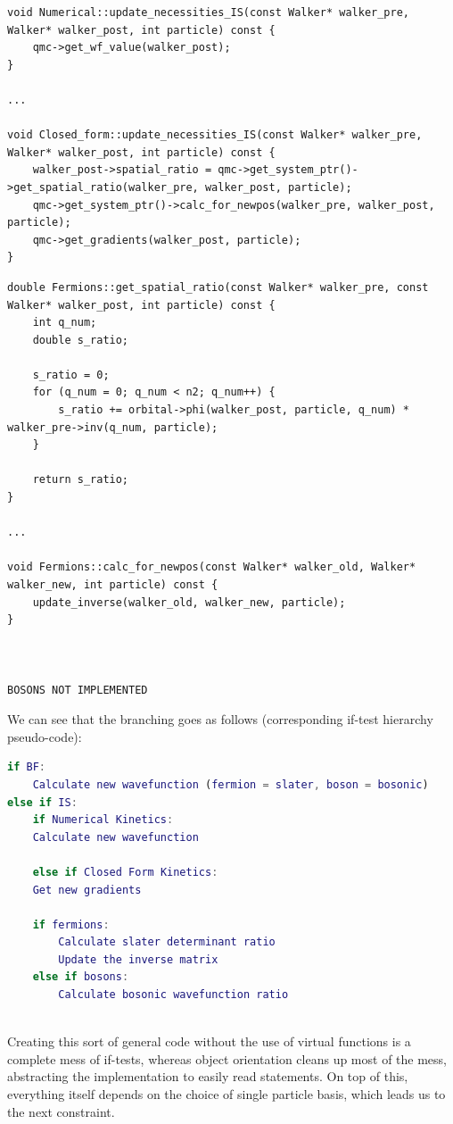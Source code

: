 \begin{lstlisting}
void Numerical::update_necessities_IS(const Walker* walker_pre, Walker* walker_post, int particle) const {
    qmc->get_wf_value(walker_post);
}

...

void Closed_form::update_necessities_IS(const Walker* walker_pre, Walker* walker_post, int particle) const {
    walker_post->spatial_ratio = qmc->get_system_ptr()->get_spatial_ratio(walker_pre, walker_post, particle);
    qmc->get_system_ptr()->calc_for_newpos(walker_pre, walker_post, particle);
    qmc->get_gradients(walker_post, particle);
}
\end{lstlisting}

\begin{lstlisting}
double Fermions::get_spatial_ratio(const Walker* walker_pre, const Walker* walker_post, int particle) const {
    int q_num;
    double s_ratio;

    s_ratio = 0;
    for (q_num = 0; q_num < n2; q_num++) {
        s_ratio += orbital->phi(walker_post, particle, q_num) * walker_pre->inv(q_num, particle);
    }

    return s_ratio;
}

...

void Fermions::calc_for_newpos(const Walker* walker_old, Walker* walker_new, int particle) const {
    update_inverse(walker_old, walker_new, particle);
}



BOSONS NOT IMPLEMENTED
\end{lstlisting}


We can see that the branching goes as follows (corresponding if-test hierarchy pseudo-code):

\begin{lstlisting}[language=Matlab]
if BF:
    Calculate new wavefunction (fermion = slater, boson = bosonic)
else if IS:
    if Numerical Kinetics:
	Calculate new wavefunction
	
    else if Closed Form Kinetics:
	Get new gradients 
	
	if fermions:
	    Calculate slater determinant ratio
	    Update the inverse matrix
	else if bosons:
	    Calculate bosonic wavefunction ratio
	
\end{lstlisting}

Creating this sort of general code without the use of virtual functions is a complete mess of if-tests, whereas object orientation cleans up most of the mess, abstracting the implementation to easily read statements. On top of this, everything itself depends on the choice of single particle basis, which leads us to the next constraint.

